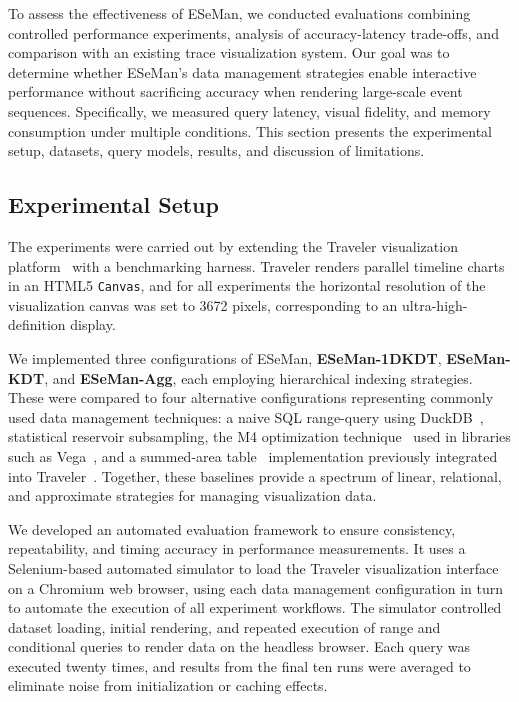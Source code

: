 \begin{refsection}
To assess the effectiveness of ESeMan, we conducted evaluations combining controlled performance experiments, analysis of accuracy-latency trade-offs, and comparison with an existing trace visualization system. Our goal was to determine whether ESeMan's data management strategies enable interactive performance without sacrificing accuracy when rendering large-scale event sequences. Specifically, we measured query latency, visual fidelity, and memory consumption under multiple conditions. This section presents the experimental setup, datasets, query models, results, and discussion of limitations.

\subsection{Experimental Setup}
The experiments were carried out by extending the Traveler visualization platform~\cite{sakin2022traveler} with a benchmarking harness. Traveler renders parallel timeline charts in an HTML5 \texttt{Canvas}, and for all experiments the horizontal resolution of the visualization canvas was set to 3672 pixels, corresponding to an ultra-high-definition display.

We implemented three configurations of ESeMan, \textbf{ESeMan-1DKDT}, \textbf{ESeMan-KDT}, and \textbf{ESeMan-Agg}, each employing hierarchical indexing strategies. These were compared to four alternative configurations representing commonly used data management techniques: a naive SQL range-query using DuckDB~\cite{raasveldt2019duckdb}, statistical reservoir subsampling, the M4 optimization technique~\cite{jugel2014m4} used in libraries such as Vega~\cite{vega}, and a summed-area table~\cite{crow1984summed} implementation previously integrated into Traveler~\cite{sakin2022traveler}. Together, these baselines provide a spectrum of linear, relational, and approximate strategies for managing visualization data.  

We developed an automated evaluation framework to ensure consistency, repeatability, and timing accuracy in performance measurements. It uses a Selenium-based automated simulator to load the Traveler visualization interface on a Chromium web browser, using each data management configuration in turn to automate the execution of all experiment workflows. The simulator controlled dataset loading, initial rendering, and repeated execution of range and conditional queries to render data on the headless browser. Each query was executed twenty times, and results from the final ten runs were averaged to eliminate noise from initialization or caching effects. 


\end{refsection}
